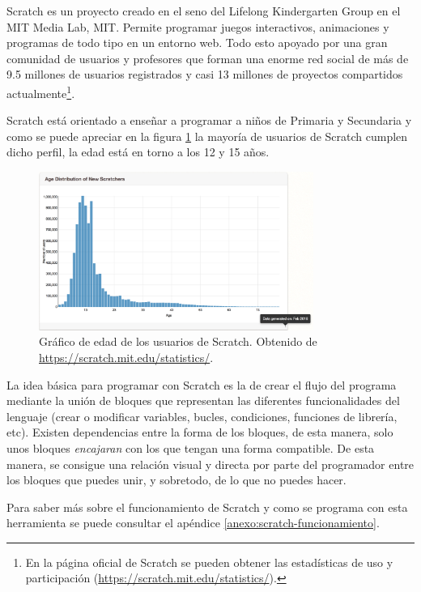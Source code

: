 {{Scratch\cite{scratch} es un proyecto creado en el seno del Lifelong Kindergarten Group en el MIT Media Lab, \acrfull{MIT}. Permite programar juegos interactivos, animaciones y programas de todo tipo en un entorno web. Todo esto apoyado por una gran comunidad de usuarios y profesores que forman una enorme red social de más de 9.5 millones de usuarios registrados y casi 13 millones de proyectos compartidos actualmente\footnote{En la página oficial de Scratch se pueden obtener las estadísticas de uso y participación (\url{https://scratch.mit.edu/statistics/}).}.

Scratch está orientado a enseñar a programar a niños de Primaria y Secundaria y como se puede apreciar en la figura \ref{fig:scratch-edad} la mayoría de usuarios de Scratch cumplen dicho perfil, la edad está en torno a los 12 y 15 años.

\begin{figure}[!ht]
	\begin{centering}
		\includegraphics[width=0.8\textwidth]{images/scratch-edad.png}
			\caption{Gráfico de edad de los usuarios de Scratch. Obtenido de \url{https://scratch.mit.edu/statistics/}.}
				\label{fig:scratch-edad}
	\end{centering}
\end{figure}


La idea básica para programar con Scratch es la de crear el flujo del programa mediante la unión de bloques que representan las diferentes funcionalidades del lenguaje (crear o modificar variables, bucles, condiciones, funciones de librería, etc). Existen dependencias entre la forma de los bloques, de esta manera, solo unos bloques \emph{encajaran} con los que tengan una forma compatible. De esta manera, se consigue una relación visual y directa por parte del programador entre los bloques que puedes unir, y sobretodo, de lo que no puedes hacer.

Para saber más sobre el funcionamiento de Scratch y como se programa con esta herramienta se puede consultar el apéndice \ref{anexo:scratch-funcionamiento}.

}}
